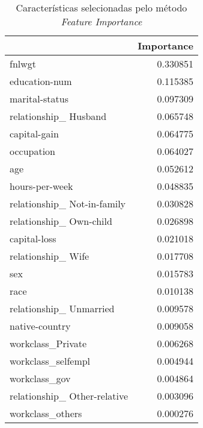 \begin{table}
\centering
\caption{Características selecionadas pelo método \textit{Feature Importance}}
\begin{tabular}{lr}
\toprule
                              &  Importance \\
\midrule
                       fnlwgt &    0.330851 \\
                education-num &    0.115385 \\
               marital-status &    0.097309 \\
        relationship\_ Husband &    0.065748 \\
                 capital-gain &    0.064775 \\
                   occupation &    0.064027 \\
                          age &    0.052612 \\
               hours-per-week &    0.048835 \\
  relationship\_ Not-in-family &    0.030828 \\
      relationship\_ Own-child &    0.026898 \\
                 capital-loss &    0.021018 \\
           relationship\_ Wife &    0.017708 \\
                          sex &    0.015783 \\
                         race &    0.010138 \\
      relationship\_ Unmarried &    0.009578 \\
               native-country &    0.009058 \\
            workclass\_Private &    0.006268 \\
           workclass\_selfempl &    0.004944 \\
                workclass\_gov &    0.004864 \\
 relationship\_ Other-relative &    0.003096 \\
             workclass\_others &    0.000276 \\
\bottomrule
\end{tabular}
\end{table}
